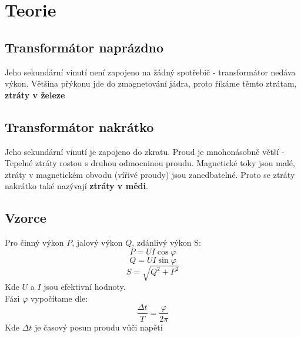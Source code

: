 \documentclass[a4paper]{article}
\begin{document}


\section*{Teorie}
\subsection*{Transform\'ator napr\'{a}zdno}
Jeho sekund\'arn\'i vinut\'i nen\'i zapojeno na \v{z}\'adn\'y spot\v{r}ebi\v{c} - transform\'ator ned\'ava v\'ykon. V\v{e}t\v{s}ina p\v{r}\'ykonu jde do zmagnetov\'an\'i j\'adra, proto \v{r}\'ik\'ame t\v{e}mto ztr\'atam, \textbf{ztr\'aty v \v{z}eleze} 
\subsection*{Transform\'ator nakr\'{a}tko}
Jeho sekund\'arn\'i vinut\'i je zapojeno do zkratu.
Proud je mnohon\'asobn\v{e} v\v{e}t\v{s}\'i - Tepeln\'e ztr\'aty rostou s druhou odmocninou proudu.
Magnetick\'e toky jsou mal\'e, ztr\'aty v magnetick\'em obvodu (v\'i\v{r}iv\'e proudy) jsou zanedbateln\'e. Proto se ztr\'aty nakr\'atko tak\'e naz\'yvaj\'i \textbf{ztr\'aty v m\v{e}di}.
\subsection*{Vzorce}
Pro \v{c}inn\'y v\'ykon $P$, jalov\'y v\'ykon $Q$, zd\'anliv\'y v\'ykon S:
\begin{equation}\label{vykon}
	P = U I \cos \varphi
\end{equation}
\begin{equation}\label{prikon}
	Q = U I \sin \varphi
\end{equation}
\begin{equation}\label{zdanlivy}
	S=\sqrt{Q^2+P^2}
\end{equation}
Kde $U$ a $I$ jsou efektivn\'i hodnoty.\\
F\'azi $\varphi$ vypo\v{c}\'itame dle:
\begin{equation}
	\frac{\Delta t}{T} = \frac{\varphi}{2\pi}
\end{equation}
Kde $\Delta t$ je \v{c}asov\'y posun proudu vů\v{c}i nap\v{e}t\'i
\end{document}

